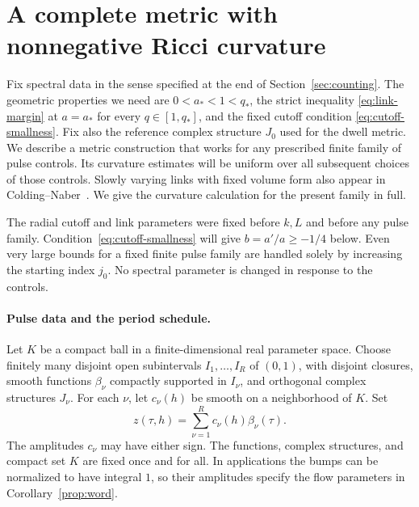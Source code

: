 \section{A complete metric with nonnegative Ricci curvature}
\label{sec:geometry}

Fix spectral data in the sense specified at the end of
Section~\ref{sec:counting}.
The geometric properties we need are \(0<a_*<1<q_*\), the strict
inequality \eqref{eq:link-margin} at \(a=a_*\) for every
\(q\in[1,q_*]\), and the fixed cutoff condition
\eqref{eq:cutoff-smallness}.
Fix also the reference complex structure \(J_0\) used for the dwell
metric.
We describe a metric construction that works for any prescribed finite
family of pulse controls.  Its curvature estimates will be uniform
over all subsequent choices of those controls.
Slowly varying links with fixed volume form also appear in
Colding--Naber~\cite[Lemma~2.1]{ColdingNaber}. We give the curvature
calculation for the present family in full.

The radial cutoff and link parameters were fixed before \(k,L\) and
before any pulse family. Condition~\eqref{eq:cutoff-smallness} will give
\(b=a'/a\geq-1/4\) below. Even very large bounds for a fixed finite
pulse family are handled solely by increasing the starting index \(j_0\).
No spectral parameter is changed in response to the controls.

\paragraph{Pulse data and the period schedule.}
Let \(K\) be a compact ball in a finite-dimensional real parameter
space.
Choose finitely many disjoint open subintervals
\(I_1,\ldots,I_R\) of \((0,1)\), with disjoint closures, smooth
functions \(\beta_\nu\) compactly supported in \(I_\nu\), and
orthogonal complex structures \(J_\nu\).
For each \(\nu\), let \(c_\nu(h)\) be smooth on a neighborhood of \(K\).
Set
\[
 z(\tau,h)=\sum_{\nu=1}^R c_\nu(h)\beta_\nu(\tau).
\]
The amplitudes \(c_\nu\) may have either sign.
The functions, complex structures, and compact set \(K\) are fixed
once and for all.
In applications the bumps can be normalized to have integral \(1\),
so their amplitudes specify the flow parameters in
Corollary~\ref{prop:word}.


